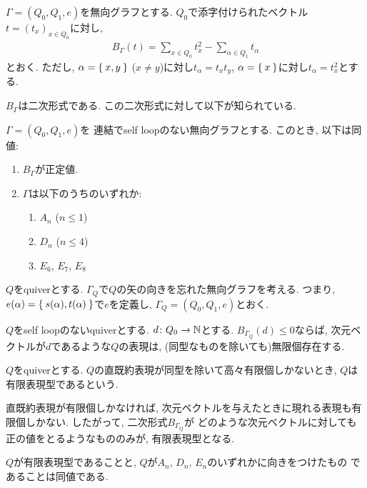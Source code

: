 \begin{definition}
  $\Gamma=(Q_0,Q_1,e)$を無向グラフとする.
  $Q_0$で添字付けられたベクトル$t=(t_x)_{x\in Q_0}$に対し,
  \begin{align*}
    B_\Gamma(t)=\sum_{x\in Q_0}t_x^2 - \sum_{\alpha \in Q_1}t_\alpha
  \end{align*}
  とおく.
  ただし,
  $\alpha=\Set{x,y}$ ($x\neq y$)に対し$t_\alpha=t_xt_y$,
  $\alpha=\Set{x}$に対し$t_\alpha=t_x^2$とする.  
\end{definition}
$B_\Gamma$は二次形式である.
この二次形式に対して以下が知られている.
\begin{lemma}
  $\Gamma=(Q_0,Q_1,e)$を
  連結でself loopのない無向グラフとする.
  このとき, 以下は同値:
  \begin{enumerate}
  \item $B_\Gamma$が正定値.
  \item $\Gamma$は以下のうちのいずれか:
    \begin{enumerate}
      \item $A_n$ ($n\leq 1$)
      \item $D_n$ ($n\leq 4$)
      \item $E_6$, $E_7$, $E_8$
    \end{enumerate}
  \end{enumerate}
\end{lemma}
\begin{definition}
  $Q$をquiverとする.
  $\Gamma_Q$で$Q$の矢の向きを忘れた無向グラフを考える.
  つまり,
  $e(\alpha)=\Set{s(\alpha), t(\alpha)}$で$e$を定義し,
  $\Gamma_Q=(Q_0,Q_1,e)$とおく.
\end{definition}

\begin{lemma}
  $Q$をself loopのないquiverとする.
  $d\colon Q_0\to \mathbb{N}$とする.
  $B_{\Gamma_Q}(d)\leq 0$ならば,
  次元ベクトルが$d$であるような$Q$の表現は,
  (同型なものを除いても)無限個存在する.
\end{lemma}


\begin{definition}
  $Q$をquiverとする.
  $Q$の直既約表現が同型を除いて高々有限個しかないとき,
  $Q$は有限表現型であるという.
\end{definition}
直既約表現が有限個しかなければ,
次元ベクトルを与えたときに現れる表現も有限個しかない.
したがって,
二次形式$B_{\Gamma_Q}$が
どのような次元ベクトルに対しても正の値をとるようなもののみが,
有限表現型となる.

\begin{theorem}[Gabrielの定理]
  $Q$が有限表現型であることと,
  $Q$が$A_n$, $D_n$, $E_n$のいずれかに向きをつけたもの
  であることは同値である.
\end{theorem}

